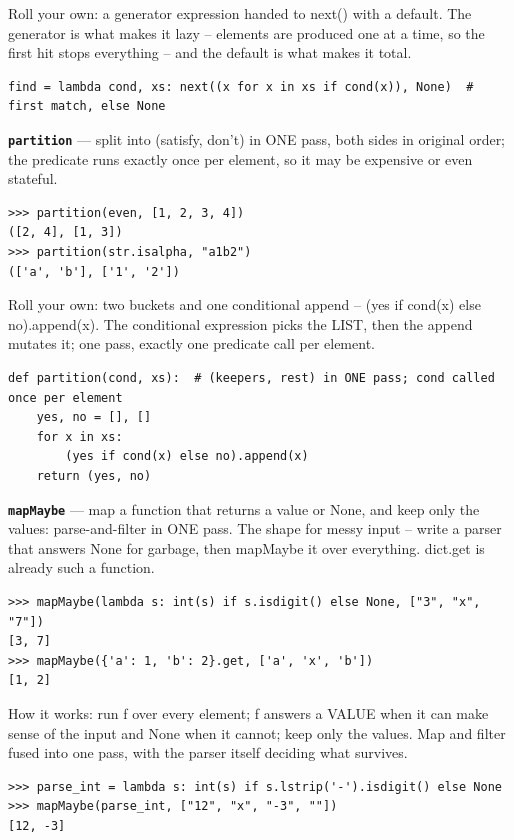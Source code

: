 \documentclass[10pt,letterpaper]{article}
\begin{document}
Roll your own: a generator expression handed to next() with a default. The generator is what makes it lazy -- elements are produced one at a time, so the first hit stops everything -- and the default is what makes it total.

\begin{lstlisting}[style=ex]
find = lambda cond, xs: next((x for x in xs if cond(x)), None)  # first match, else None
\end{lstlisting}
\textbf{\texttt{partition}} --- split into (satisfy, don't) in ONE pass, both sides in original order; the predicate runs exactly once per element, so it may be expensive or even stateful.
\begin{lstlisting}[style=ex]
>>> partition(even, [1, 2, 3, 4])
([2, 4], [1, 3])
>>> partition(str.isalpha, "a1b2")
(['a', 'b'], ['1', '2'])
\end{lstlisting}

Roll your own: two buckets and one conditional append -- (yes if cond(x) else no).append(x). The conditional expression picks the LIST, then the append mutates it; one pass, exactly one predicate call per element.

\begin{lstlisting}[style=ex]
def partition(cond, xs):  # (keepers, rest) in ONE pass; cond called once per element
    yes, no = [], []
    for x in xs:
        (yes if cond(x) else no).append(x)
    return (yes, no)
\end{lstlisting}
\textbf{\texttt{mapMaybe}} --- map a function that returns a value or None, and keep only the values: parse-and-filter in ONE pass. The shape for messy input -- write a parser that answers None for garbage, then mapMaybe it over everything. dict.get is already such a function.
\begin{lstlisting}[style=ex]
>>> mapMaybe(lambda s: int(s) if s.isdigit() else None, ["3", "x", "7"])
[3, 7]
>>> mapMaybe({'a': 1, 'b': 2}.get, ['a', 'x', 'b'])
[1, 2]
\end{lstlisting}

How it works: run f over every element; f answers a VALUE when it can make sense of the input and None when it cannot; keep only the values. Map and filter fused into one pass, with the parser itself deciding what survives.

\begin{lstlisting}[style=ex]
>>> parse_int = lambda s: int(s) if s.lstrip('-').isdigit() else None
>>> mapMaybe(parse_int, ["12", "x", "-3", ""])
[12, -3]
\end{lstlisting}
\end{document}
